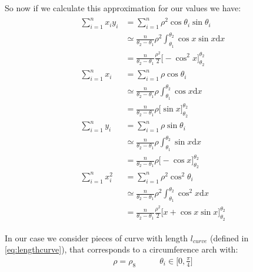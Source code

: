 \begin{itemize}
\begin{itemize}
So now if we calculate this approximation for our values we have:
\begin{align}
\begin{split}
\sum_{i=1}^{n}{x_iy_i} &= \sum_{i=1}^{n}{\rho^2\cos{\theta_i}\sin{\theta_i}}   \\
& \simeq  \frac{n}{\theta_2 - \theta_1}  \rho^2 \int_{\theta_1}^{\theta_2}{\cos{x}\sin{x} \mathrm  {d}x} \\
&=  \frac{n}{\theta_2 - \theta_1}  \frac{ \rho^2}{2} \Big[-\cos^2{x} \Big]_{\theta_2}^{\theta_2} \\[10pt]
 \sum_{i=1}^{n}{x_i} &= \sum_{i=1}^{n}{\rho\cos{\theta_i}} \\
&\simeq  \frac{n}{\theta_2 - \theta_1}  \rho \int_{\theta_1}^{\theta_2}{\cos{x}\mathrm  {d}x} \\
&= \frac{n}{\theta_2 - \theta_1}  \rho \Big[\sin{x} \Big]_{\theta_2}^{\theta_2}\\[10pt]
 \sum_{i=1}^{n}{y_i} &= \sum_{i=1}^{n}{\rho\sin{\theta_i}} \\
& \simeq  \frac{n}{\theta_2 - \theta_1}  \rho \int_{\theta_1}^{\theta_2}{\sin{x}\mathrm  {d}x} \\
&= \frac{n}{\theta_2 - \theta_1}  \rho \Big[-\cos{x} \Big]_{\theta_2}^{\theta_2}\\[10pt]
 \sum_{i=1}^{n}{x_i^2} &= \sum_{i=1}^{n}{\rho^2\cos^2{\theta_i}} \\
& \simeq  \frac{n}{\theta_2 - \theta_1}  \rho^2 \int_{\theta_1}^{\theta_2}{\cos^2{x}\mathrm  {d}x} \\
&=  \frac{n}{\theta_2 - \theta_1}  \frac{ \rho^2}{2} \Big[ x+\cos{x} \sin{x}\Big]_{\theta_2}^{\theta_2}
\end{split}
\label{eq:mandqintegralsoncircum}
\end{align}

In our case we consider pieces of curve with length $l_{curve}$ (defined in \ref{eq:lengthcurve}), that corresponds to a circumference arch with:
\begin{align}
\rho = \rho_8  \ \ \ \ \ \ \ \ \ \ \ \ \ 
\theta_i \in \Big[0,\frac{\pi}{4}\Big]
\label{eq:valuessircum}
\end{align}


\end{itemize}
\end{itemize}
